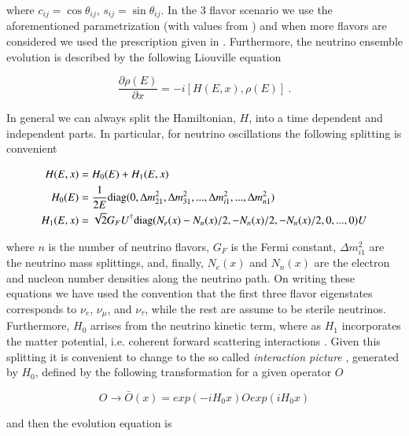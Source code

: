 \documentclass[3p,12pt,authoryear]{elsarticle}
\newcommand{\pa}[2]{\frac{\partial #1}{\partial #2}}
\begin{document}
where $c_{ij} = \cos \theta_{ij}$, $s_{ij} = \sin \theta_{ij}$. In the 3 flavor scenario we use the aforementioned parametrization (with values from \citep{gonzalez2012global}) and when more flavors are considered we used the prescription given in \citet{SQUIDS}. Furthermore, the neutrino ensemble evolution is described by the following Liouville equation

\begin{equation}
\pa{\rho(E)}{x} = -i [ H (E,x), \rho(E) ]~.
\label{eq:schrodinger}
\end{equation}

In general we can always split the Hamiltonian, $H$, into a time dependent and independent parts. In particular, for neutrino oscillations the following splitting is convenient

\begin{subequations}
\label{eq:hamiltonian}
\begin{align}
H(E,x) &= H_0(E)  + H_{1}(E,x) \\
H_0 (E) &= \frac{1}{2E} {\rm diag}( 0 , \Delta m^2_{21},\Delta m^2_{31},...,\Delta m^2_{i1},...,\Delta m^2_{n1}) \label{eq:h0} \\
H_1 (E,x) &= \sqrt{2} G_F U^\dagger {\rm diag} ( N_e(x) - N_n(x)/2, -N_n(x)/2, -N_n(x)/2 , 0,...,0 )U\label{eq:hi} 
\end{align}
\end{subequations}

where $n$ is the number of neutrino flavors, $G_F$ is the Fermi constant, $\Delta m^2_{i1}$ are the neutrino mass splittings, and, finally, $N_e(x)$ and $N_n(x)$ are the electron and nucleon number densities along the neutrino path. On writing these equations we have used the convention that the first three flavor eigenstates corresponds to $\nu_e$, $\nu_\mu$, and $\nu_\tau$, while the rest are assume to be sterile neutrinos. Furthermore, $H_0$ arrises from the neutrino kinetic term, where as $H_1$ incorporates the matter potential, i.e. coherent forward scattering interactions \citep{Mikheev:1986gs,Mikheev:1986wj,Wolfenstein:1977ue}. Given this splitting it is convenient to change to the so called {\it interaction picture} , generated by $H_0$, defined by the following transformation for a given operator $O$

\begin{equation}
O \to \bar{O}(x)=exp(-iH_0x)Oexp(iH_0x)
\end{equation}

and then the evolution equation is
\end{document}
